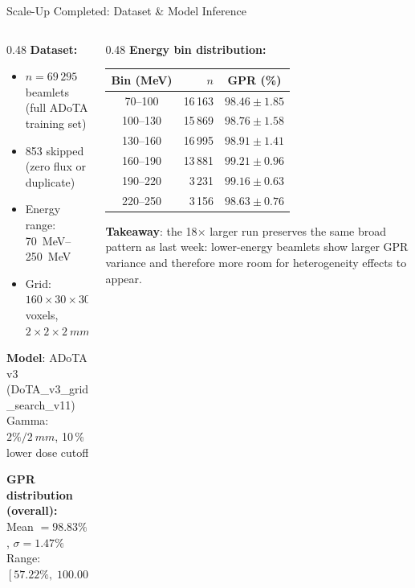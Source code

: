 \documentclass[aspectratio=169, 10pt]{beamer}
\begin{document}
\begin{frame}{Scale-Up Completed: Dataset \& Model Inference}
  \begin{columns}[T]
    \begin{column}{0.48\textwidth}
      \textbf{Dataset:}
      \begin{itemize}
        \item $n = 69\,295$ beamlets (full ADoTA training set)
        \item 853 skipped (zero flux or duplicate)
        \item Energy range: \SIrange{70}{250}{MeV}
        \item Grid: $160 \times 30 \times 30$ voxels,
              $2 \times 2 \times \SI{2}{mm}$
      \end{itemize}

      \vspace{6pt}
      \textbf{Model}: ADoTA v3 (DoTA\_v3\_grid\_search\_v11)\\
      Gamma: $2\%/\SI{2}{mm}$, 10\,\% lower dose cutoff

      \vspace{6pt}
      \textbf{GPR distribution (overall):}\\
      Mean $= 98.83\%$, $\sigma = 1.47\%$\\
      Range: $[57.22\%,\; 100.00\%]$
    \end{column}
    \begin{column}{0.48\textwidth}
      \textbf{Energy bin distribution:}
      \vspace{4pt}
      \begin{center}
        \begin{tabular}{crc}
          \toprule
          \textbf{Bin (MeV)} & \textbf{$n$} & \textbf{GPR (\%)} \\
          \midrule
          70--100  & 16\,163 & $98.46 \pm 1.85$ \\
          100--130 & 15\,869 & $98.76 \pm 1.58$ \\
          130--160 & 16\,995 & $98.91 \pm 1.41$ \\
          160--190 & 13\,881 & $99.21 \pm 0.96$ \\
          190--220 &  3\,231 & $99.16 \pm 0.63$ \\
          220--250 &  3\,156 & $98.63 \pm 0.76$ \\
          \bottomrule
        \end{tabular}
      \end{center}
      {\small \textbf{Takeaway}: the 18$\times$ larger run preserves the
      same broad pattern as last week: lower-energy beamlets show larger
      GPR variance and therefore more room for heterogeneity effects to appear.}
    \end{column}
  \end{columns}
\end{frame}
\end{document}
